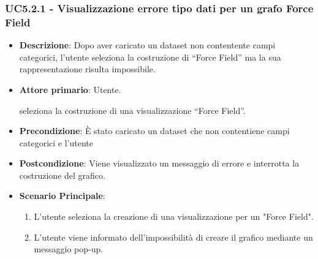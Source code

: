 \subsubsection{UC5.2.1 - Visualizzazione errore tipo dati per un grafo Force Field}
\label{subsec:uc5.1.2}
\begin{itemize}
    \item \textbf{Descrizione}: Dopo aver caricato un dataset non contentente campi categorici, 
                                l’utente seleziona la costruzione di “Force Field” ma 
                                la sua rappresentazione risulta impossibile.

    \item \textbf{Attore primario}: Utente.
    
    seleziona la costruzione di una visualizzazione “Force Field”.
    \item \textbf{Precondizione}:   È stato caricato un dataset che non contentiene campi categorici e l’utente 

    \item \textbf{Postcondizione}:  Viene visualizzato un messaggio di errore e interrotta la costruzione del grafico.
    
    \item \textbf{Scenario Principale}: 
    \begin{enumerate}
        \item L'utente seleziona la creazione di una visualizzazione per un "Force Field".
        \item L'utente viene informato dell'impossibilità di creare il grafico mediante un messaggio pop-up.
    \end{enumerate}
\end{itemize}




